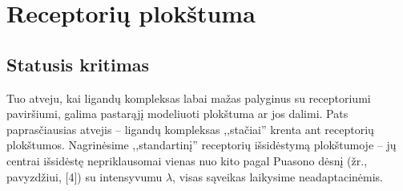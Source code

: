 \documentclass[10pt]{article}
\begin{document}
\section{Receptorių plokštuma}
\subsection{Statusis kritimas}
Tuo atveju, kai ligandų kompleksas labai mažas palyginus su 
receptoriumi paviršiumi, galima pastarąjį modeliuoti plokštuma ar jos dalimi. Pats paprasčiausias atvejis -- ligandų kompleksas ,,stačiai'' krenta ant receptorių plokštumos. Nagrinėsime ,,standartinį''  receptorių išsidėstymą plokštumoje -- jų centrai išsidėstę nepriklausomai vienas nuo kito pagal Puasono dėsnį (žr., pavyzdžiui, [4]) su intensyvumu $\lambda$, visas sąveikas laikysime neadaptacinėmis. 


\end{document}
